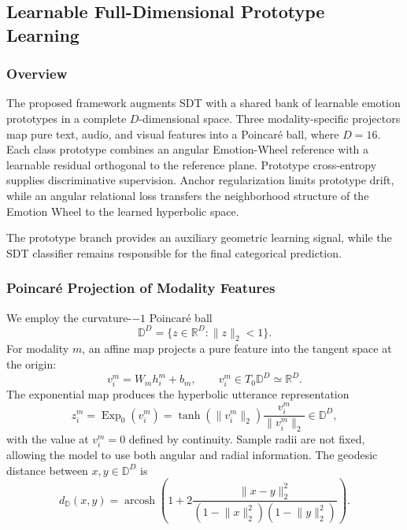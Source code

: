 \documentclass[letterpaper,journal]{IEEEtran}
\begin{document}
\subsection{Learnable Full-Dimensional Prototype Learning}
\label{subsec:rgrpl}

\subsubsection{Overview}

The proposed framework augments SDT with a shared bank of learnable emotion
prototypes in a complete \(D\)-dimensional space. Three modality-specific
projectors map pure text, audio, and visual features into a Poincar\'e ball,
where \(D=16\). Each class prototype combines an angular Emotion-Wheel
reference with a learnable residual orthogonal to the reference plane.
Prototype cross-entropy supplies discriminative supervision. Anchor
regularization limits prototype drift, while an angular relational loss
transfers the neighborhood structure of the Emotion Wheel to the learned
hyperbolic space.

The prototype branch provides an auxiliary geometric learning signal, while
the SDT classifier remains responsible for the final categorical prediction.

\subsubsection{Poincar\'e Projection of Modality Features}

We employ the curvature-\(-1\) Poincar\'e ball
\begin{equation}
    \mathbb{D}^{D}
    =\{z\in\mathbb{R}^{D}:\lVert z\rVert_2<1\}.
    \label{eq:rgrpl_poincare_ball}
\end{equation}
For modality \(m\), an affine map projects a pure feature into the tangent
space at the origin:
\begin{equation}
    v_i^m=W_m h_i^m+b_m,
    \qquad v_i^m\in T_0\mathbb{D}^{D}\simeq\mathbb{R}^{D}.
    \label{eq:rgrpl_feature_tangent}
\end{equation}
The exponential map produces the hyperbolic utterance representation
\begin{equation}
    z_i^m=\operatorname{Exp}_0(v_i^m)
    =\tanh(\lVert v_i^m\rVert_2)
    \frac{v_i^m}{\lVert v_i^m\rVert_2}
    \in\mathbb{D}^{D},
    \label{eq:rgrpl_feature_expmap}
\end{equation}
with the value at \(v_i^m=0\) defined by continuity. Sample radii are not
fixed, allowing the model to use both angular and radial information. The
geodesic distance between \(x,y\in\mathbb{D}^{D}\) is
\begin{equation}
    d_{\mathbb{D}}(x,y)
    =\operatorname{arcosh}\!\left(
    1+2\frac{\lVert x-y\rVert_2^2}
    {(1-\lVert x\rVert_2^2)(1-\lVert y\rVert_2^2)}
    \right).
    \label{eq:rgrpl_poincare_distance}
\end{equation}
\end{document}
